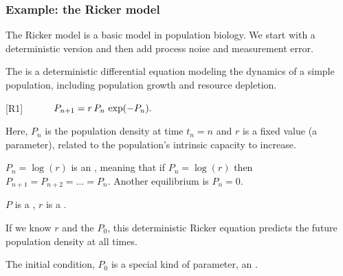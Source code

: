 \documentclass{beamer}\usepackage[]{graphicx}\usepackage[]{color}
\newcommand\myeq{\hspace{10mm}}
\begin{document}
\begin{frame}[fragile] 

\frametitle{Example: the Ricker model}


\vspace{-1mm}

\bi

\item The Ricker model is a basic model in population biology. We start with a deterministic version and then add process noise and measurement error.


\item The  is a deterministic differential equation modeling the dynamics of a simple population, including population growth and resource depletion.
\ei
\vspace{1mm}

[R1] $ \myeq P_{n+1} = r\,P_{n}\,\exp(-P_{n}).$

\vspace{1mm}
\bi
\item Here, $P_n$ is the population density at time $t_n=n$ and $r$ is a fixed value (a parameter), related to the population's intrinsic capacity to increase.

\item $P_n=\log(r)$ is an , meaning that if $P_n=\log(r)$ then $P_{n+1}=P_{n+2}=\dots = P_n$. Another equilibrium is $P_n=0$. 

\item  $P$ is a , $r$ is a .

\item If we know $r$ and the  $P_0$, this deterministic Ricker equation predicts the future population density at all times.

\item The initial condition, $P_0$ is a special kind of parameter, an .
\ei

\end{frame}   
\end{document}
